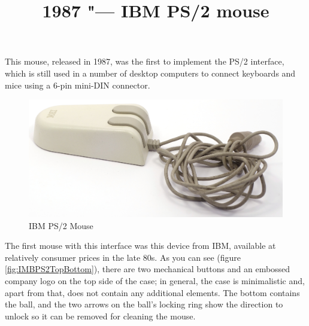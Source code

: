 \documentclass[11pt, a4paper]{article}
\begin{document}
\title{1987 "--- IBM PS/2 mouse}
\date{}
\maketitle

This mouse, released in 1987, was the first to implement the PS/2 interface, which is still used in a number of desktop computers to connect keyboards and mice using a 6-pin mini-DIN connector.

\begin{figure}[h]
    \centering
    \includegraphics[width=\textwidth]{1987_ibm_ps2_mouse/num0.JPG}
    \caption{IBM PS/2 Mouse}
    \label{fig:IMBPS2Pic}
\end{figure}

The first mouse with this interface was this device from IBM, available at relatively consumer prices in the late 80s. As you can see (figure \ref{fig:IMBPS2TopBottom}), there are two mechanical buttons and an embossed company logo on the top side of the case; in general, the case is minimalistic and, apart from that, does not contain any additional elements. The bottom contains the ball, and the two arrows on the ball's locking ring show the direction to unlock so it can be removed for cleaning the mouse.
\end{document}
